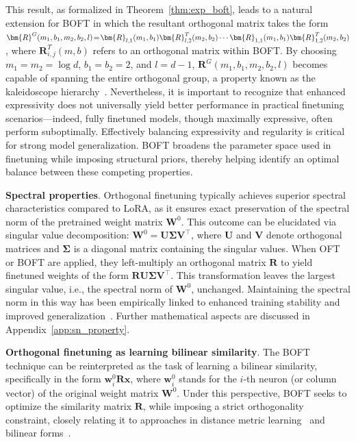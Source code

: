 This result, as formalized in Theorem~\ref{thm:exp_boft}, leads to a natural extension for BOFT in which the resultant orthogonal matrix takes the form $\thickmuskip=2mu \medmuskip=2mu \bm{R}^G(m_1,b_1,m_2,b_2,l)=\bm{R}_{l,1}(m_1,b_1)\bm{R}_{l,2}^T(m_2,b_2)\cdots\bm{R}_{1,1}(m_1,b_1)\bm{R}_{1,2}^T(m_2,b_2)$, where $\bm{R}_{i,j}^T(m,b)$ refers to an orthogonal matrix within BOFT. By choosing $m_1=m_2=\log d$, $b_1=b_2=2$, and $l=d-1$, $\bm{R}^G(m_1,b_1,m_2,b_2,l)$ becomes capable of spanning the entire orthogonal group, a property known as the kaleidoscope hierarchy~\cite{dao2019kaleidoscope}. Nevertheless, it is important to recognize that enhanced expressivity does not universally yield better performance in practical finetuning scenarios—indeed, fully finetuned models, though maximally expressive, often perform suboptimally. Effectively balancing expressivity and regularity is critical for strong model generalization. BOFT broadens the parameter space used in finetuning while imposing structural priors, thereby helping identify an optimal balance between these competing properties.

\textbf{Spectral properties}. Orthogonal finetuning typically achieves superior spectral characteristics compared to LoRA, as it ensures exact preservation of the spectral norm of the pretrained weight matrix $\bm{W}^0$. This outcome can be elucidated via singular value decomposition: $\bm{W}^0=\bm{U}\bm{\Sigma}\bm{V}^\top$, where $\bm{U}$ and $\bm{V}$ denote orthogonal matrices and $\bm{\Sigma}$ is a diagonal matrix containing the singular values. When OFT or BOFT are applied, they left-multiply an orthogonal matrix $\bm{R}$ to yield finetuned weights of the form $\bm{R}\bm{U}\bm{\Sigma}\bm{V}^\top$. This transformation leaves the largest singular value, i.e., the spectral norm of $\bm{W}^0$, unchanged. Maintaining the spectral norm in this way has been empirically linked to enhanced training stability and improved generalization~\cite{miyato2018spectral,yoshida2017spectral}. Further mathematical aspects are discussed in Appendix~\ref{app:sn_property}.

\textbf{Orthogonal finetuning as learning bilinear similarity}. The BOFT technique can be reinterpreted as the task of learning a bilinear similarity, specifically in the form $\bm{w}^0_i\bm{R}\bm{x}$, where $\bm{w}^0_i$ stands for the $i$-th neuron (or column vector) of the original weight matrix $\bm{W}^0$. Under this perspective, BOFT seeks to optimize the similarity matrix $\bm{R}$, while imposing a strict orthogonality constraint, closely relating it to approaches in distance metric learning~\cite{xing2002distance} and bilinear forms~\cite{roman2005advanced}.

